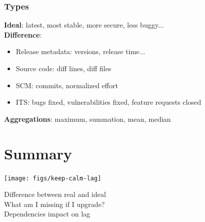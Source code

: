 \documentclass[17pt,aspectratio=169,hyperref=pdfusetitle]{beamer}
\begin{document}
\begin{frame}[fragile]
  \frametitle{Types}

  {\small
  \textbf{Ideal}: latest, most stable, more secure, less buggy... \\

  \textbf{Difference}: \\
  \begin{itemize}
  \item Release metadata: versions, release time...
  \item Source code: diff lines, diff files
  \item SCM: commits, normalized effort
  \item ITS: bugs fixed, vulnerabilities fixed, feature requests closed
  \end{itemize}

  \textbf{Aggregations}: maximum, summation, mean, median \\
  }
\end{frame}

\section{Summary}

\begin{frame}[fragile]

  \texttt{[image: figs/keep-calm-lag]}

\end{frame}

\begin{frame}[fragile]

  {\Large
    Difference between real and ideal \\
    \vspace{.5cm}
    What am I missing if I upgrade? \\
    \vspace{.5cm}
    Dependencies impact on lag \\
  }
\end{frame}
\end{document}
